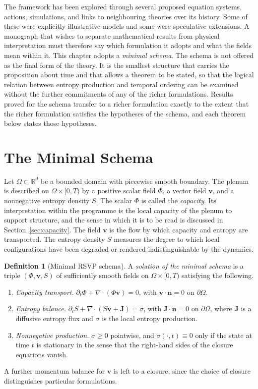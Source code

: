 \documentclass[11pt,twoside,openright]{book}
\theoremstyle{plain}
\theoremstyle{definition}
\newtheorem{definition}[theorem]{Definition}
\theoremstyle{remark}
\newcommand{\R}{\mathbb{R}}
\begin{document}
The framework has been explored through several proposed equation systems, actions, simulations, and links to neighbouring theories over its history. Some of these were explicitly illustrative models and some were speculative extensions. A monograph that wishes to separate mathematical results from physical interpretation must therefore say which formulation it adopts and what the fields mean within it. This chapter adopts a \emph{minimal schema}. The schema is not offered as the final form of the theory. It is the smallest structure that carries the proposition about time and that allows a theorem to be stated, so that the logical relation between entropy production and temporal ordering can be examined without the further commitments of any of the richer formulations. Results proved for the schema transfer to a richer formulation exactly to the extent that the richer formulation satisfies the hypotheses of the schema, and each theorem below states those hypotheses.

\section{The Minimal Schema}

Let $\Omega\subset\R^d$ be a bounded domain with piecewise smooth boundary. The plenum is described on $\Omega\times[0,T)$ by a positive scalar field $\Phi$, a vector field $\mathbf{v}$, and a nonnegative entropy density $S$. The scalar $\Phi$ is called the \emph{capacity}. Its interpretation within the programme is the local capacity of the plenum to support structure, and the sense in which it is to be read is discussed in Section~\ref{sec:capacity}. The field $\mathbf{v}$ is the flow by which capacity and entropy are transported. The entropy density $S$ measures the degree to which local configurations have been degraded or rendered indistinguishable by the dynamics.

\begin{definition}[Minimal RSVP schema]\label{def:schema}
A \emph{solution of the minimal schema} is a triple $(\Phi,\mathbf{v},S)$ of sufficiently smooth fields on $\Omega\times[0,T)$ satisfying the following.
\begin{enumerate}
\item[(R1)] \emph{Capacity transport.} $\partial_t\Phi+\nabla\!\cdot(\Phi\mathbf{v})=0$, with $\mathbf{v}\cdot\mathbf{n}=0$ on $\partial\Omega$.
\item[(R2)] \emph{Entropy balance.} $\partial_t S+\nabla\!\cdot(S\mathbf{v}+\mathbf{J})=\sigma$, with $\mathbf{J}\cdot\mathbf{n}=0$ on $\partial\Omega$, where $\mathbf{J}$ is a diffusive entropy flux and $\sigma$ is the local entropy production.
\item[(R3)] \emph{Nonnegative production.} $\sigma\ge0$ pointwise, and $\sigma(\cdot,t)\equiv0$ only if the state at time $t$ is stationary in the sense that the right-hand sides of the closure equations vanish.
\end{enumerate}
A further momentum balance for $\mathbf{v}$ is left to a closure, since the choice of closure distinguishes particular formulations.
\end{definition}
\end{document}
